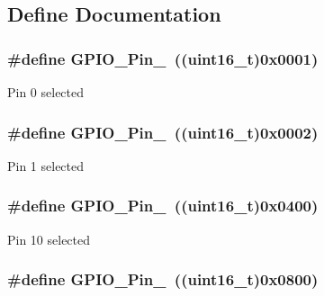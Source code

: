 \subsection{Define Documentation}
\hypertarget{group__GPIO__pins__define_gab305b8d1be9f89bf2b4a05589b456049}{
\subsubsection[{GPIO\_\-Pin\_\-0}]{\setlength{\rightskip}{0pt plus 5cm}\#define GPIO\_\-Pin\_~((uint16\_\-t)0x0001)}}
\label{group__GPIO__pins__define_gab305b8d1be9f89bf2b4a05589b456049}
Pin 0 selected \hypertarget{group__GPIO__pins__define_ga29db642c26f1fa0fffc3ecadcd30f82b}{
\subsubsection[{GPIO\_\-Pin\_\-1}]{\setlength{\rightskip}{0pt plus 5cm}\#define GPIO\_\-Pin\_~((uint16\_\-t)0x0002)}}
\label{group__GPIO__pins__define_ga29db642c26f1fa0fffc3ecadcd30f82b}
Pin 1 selected \hypertarget{group__GPIO__pins__define_ga726af6407ba60ac60f02057227c2d348}{
\subsubsection[{GPIO\_\-Pin\_\-10}]{\setlength{\rightskip}{0pt plus 5cm}\#define GPIO\_\-Pin\_~((uint16\_\-t)0x0400)}}
\label{group__GPIO__pins__define_ga726af6407ba60ac60f02057227c2d348}
Pin 10 selected \hypertarget{group__GPIO__pins__define_ga5139d5bc3d15784ae7794ed2ae1ff767}{
\subsubsection[{GPIO\_\-Pin\_\-11}]{\setlength{\rightskip}{0pt plus 5cm}\#define GPIO\_\-Pin\_~((uint16\_\-t)0x0800)}}
\label{group__GPIO__pins__define_ga5139d5bc3d15784ae7794ed2ae1ff767}
